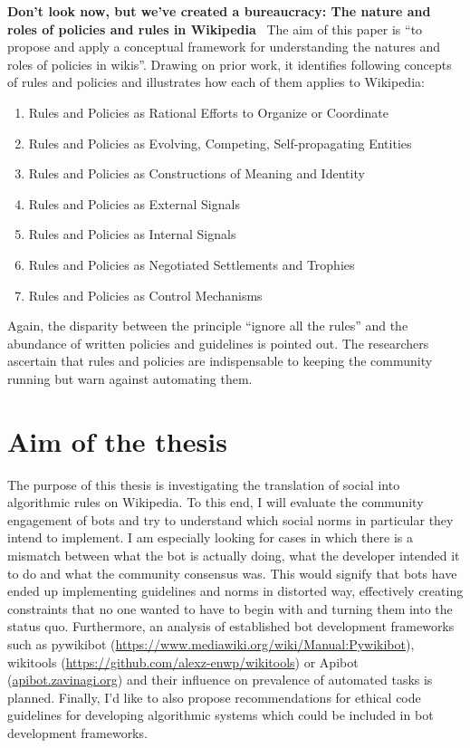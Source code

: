 \documentclass[pdftex,a4paper,11pt]{scrartcl}
\begin{document}
\textbf{Don't look now, but we've created a bureaucracy: The nature and roles of policies and rules in Wikipedia}~\cite{ButJoyPi2008}
\newline
\newline
The aim of this paper is ``to propose and apply a conceptual framework for understanding the natures and roles of policies in wikis''.
Drawing on prior work, it identifies following concepts of rules and policies and illustrates how each of them applies to Wikipedia:
\begin{enumerate}
    \item Rules and Policies as Rational Efforts to Organize or Coordinate
    \item Rules and Policies as Evolving, Competing, Self-propagating Entities
    \item Rules and Policies as Constructions of Meaning and Identity
    \item Rules and Policies as External Signals
    \item Rules and Policies as Internal Signals
    \item Rules and Policies as Negotiated Settlements and Trophies
    \item Rules and Policies as Control Mechanisms
\end{enumerate}
Again, the disparity between the principle ``ignore all the rules'' and the abundance of written policies and guidelines is pointed out.
The researchers ascertain that rules and policies are indispensable to keeping the community running but warn against automating them.


\section{Aim of the thesis}
The purpose of this thesis is investigating the translation of social into algorithmic rules on Wikipedia.
To this end, I will evaluate the community engagement of bots and try to understand which social norms in particular they intend to implement.
I am especially looking for cases in which there is a mismatch between what the bot is actually doing, what the developer intended it to do and what the community consensus was.
This would signify that bots have ended up implementing guidelines and norms in distorted way, effectively creating constraints that no one wanted to have to begin with and turning them into the status quo.
Furthermore, an analysis of established bot development frameworks such as pywikibot (\url{https://www.mediawiki.org/wiki/Manual:Pywikibot}), wikitools (\url{https://github.com/alexz-enwp/wikitools}) or Apibot (\url{apibot.zavinagi.org}) and their influence on prevalence of automated tasks is planned.
Finally, I'd like to also propose recommendations for ethical code guidelines for developing algorithmic systems which could be included in bot development frameworks.
\end{document}
